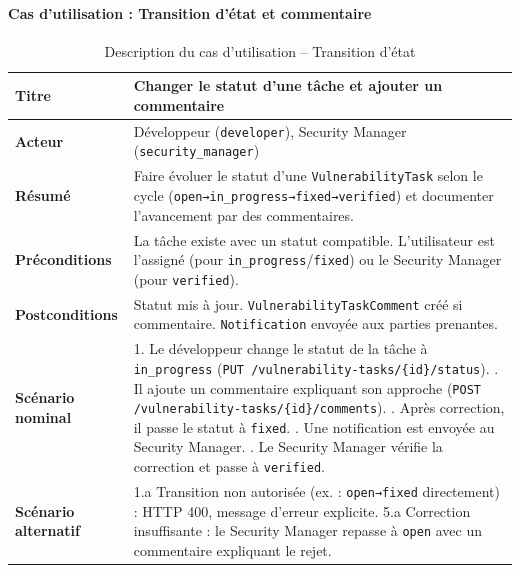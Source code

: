 \paragraph{Cas d'utilisation : Transition d'état et commentaire}
\begin{table}[H]
\centering
\caption{Description du cas d'utilisation -- Transition d'état}
\label{tab:uc-task-status}
\small
\renewcommand{\arraystretch}{1.3}
\begin{tabularx}{\textwidth}{>{\bfseries}p{3.5cm} X}
\hline
Titre & Changer le statut d'une tâche et ajouter un commentaire \\
\hline
Acteur & Développeur (\texttt{developer}), Security Manager (\texttt{security\_manager}) \\
\hline
Résumé & Faire évoluer le statut d'une \texttt{VulnerabilityTask} selon le cycle (\texttt{open→in\_progress→fixed→verified}) et documenter l'avancement par des commentaires. \\
\hline
Préconditions & La tâche existe avec un statut compatible. L'utilisateur est l'assigné (pour \texttt{in\_progress}/\texttt{fixed}) ou le Security Manager (pour \texttt{verified}). \\
\hline
Postconditions & Statut mis à jour. \texttt{VulnerabilityTaskComment} créé si commentaire. \texttt{Notification} envoyée aux parties prenantes. \\
\hline
Scénario nominal &
1. Le développeur change le statut de la tâche à \texttt{in\_progress} (\texttt{PUT /vulnerability-tasks/\{id\}/status}). \newline
2. Il ajoute un commentaire expliquant son approche (\texttt{POST /vulnerability-tasks/\{id\}/comments}). \newline
3. Après correction, il passe le statut à \texttt{fixed}. \newline
4. Une notification est envoyée au Security Manager. \newline
5. Le Security Manager vérifie la correction et passe à \texttt{verified}. \\
\hline
Scénario alternatif &
1.a Transition non autorisée (ex. : \texttt{open→fixed} directement) : HTTP 400, message d'erreur explicite. \newline
5.a Correction insuffisante : le Security Manager repasse à \texttt{open} avec un commentaire expliquant le rejet. \\
\hline
\end{tabularx}
\end{table}

